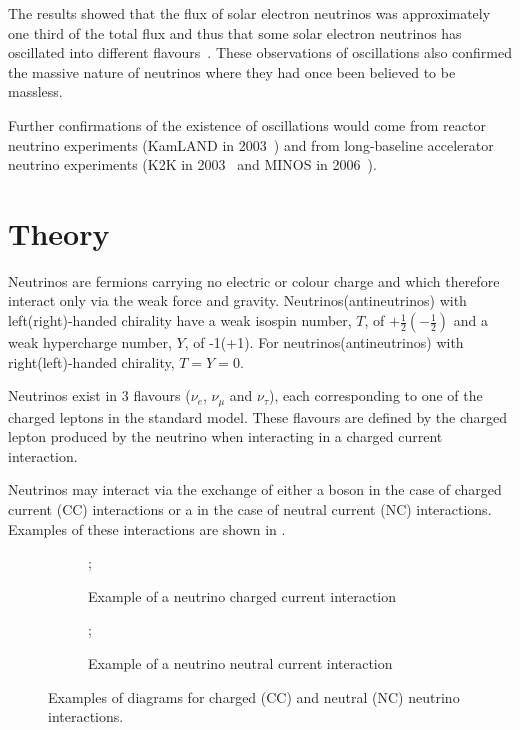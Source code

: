 The results showed that the flux of solar electron neutrinos was approximately one third of the total flux and thus that some solar electron neutrinos has oscillated into different flavours~\cite{SNO}.
These observations of oscillations also confirmed the massive nature of neutrinos where they had once been believed to be massless.

Further confirmations of the existence of oscillations would come from reactor neutrino experiments (KamLAND in 2003~\cite{kamland2003}) and from long-baseline accelerator neutrino experiments (K2K in 2003~\cite{k2kDisapp} and MINOS in 2006~\cite{minosDisapp}).

\section{Theory}
\label{sec:theory:theory}

Neutrinos are fermions carrying no electric or colour charge and which therefore interact only via the weak force and gravity.
Neutrinos(antineutrinos) with left(right)-handed chirality have a weak isospin number, $T$, of $+\frac{1}{2}\left(-\frac{1}{2}\right)$ and a weak hypercharge number, $Y$, of -1(+1).
For neutrinos(antineutrinos) with right(left)-handed chirality, $T = Y = 0$.

Neutrinos exist in 3 flavours ($\nu_{e}$, $\nu_{\mu}$ and $\nu_{\tau}$), each corresponding to one of the charged leptons in the standard model.
These flavours are defined by the charged lepton produced by the neutrino when interacting in a charged current interaction.


Neutrinos may interact via the exchange of either a \wpm boson in the case of charged current (CC) interactions or a \zboson in the case of neutral current (NC) interactions.
Examples of these interactions are shown in .

\begin{figure}[h]
  \centering
  \begin{subfigure}[t]{.49\textwidth}
    \centering
    ;
    \caption{Example of a neutrino charged current interaction}
  \end{subfigure}
  \hfill
  \begin{subfigure}[t]{.49\textwidth}
    \centering
    ;    
    \caption{Example of a neutrino neutral current interaction}
  \end{subfigure}
  \caption{Examples of diagrams for charged (CC) and neutral (NC) neutrino interactions.}
  \label{fig:nuIntEx}
\end{figure}


